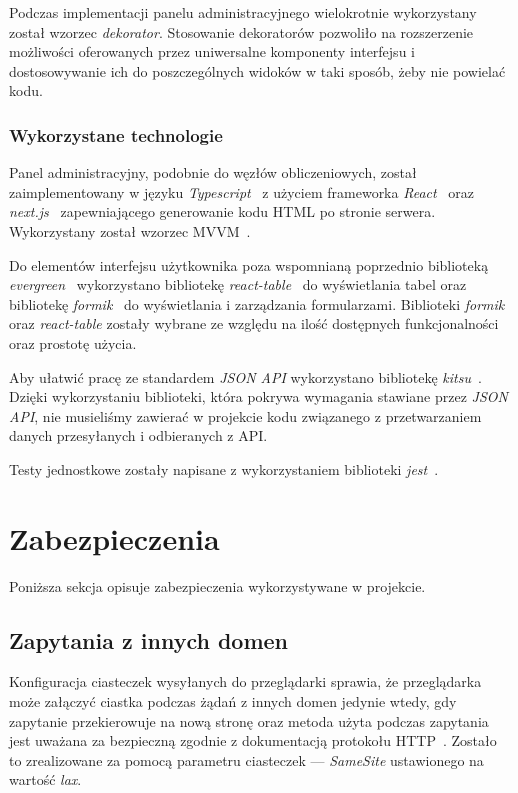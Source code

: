 \documentclass[a4paper,11pt,twoside]{report}
\theoremstyle{definition}
\begin{document}
Podczas implementacji panelu administracyjnego wielokrotnie wykorzystany został wzorzec \textit{dekorator}. Stosowanie dekoratorów pozwoliło na rozszerzenie możliwości oferowanych przez uniwersalne komponenty interfejsu i dostosowywanie ich do poszczególnych widoków w taki sposób, żeby nie powielać kodu.


\subsubsection{Wykorzystane technologie}
Panel administracyjny, podobnie do węzłów obliczeniowych, został zaimplementowany w języku \textit{Typescript}~\cite{typescript} z użyciem frameworka \textit{React}~\cite{react} oraz \textit{next.js}~\cite{next.js} zapewniającego generowanie kodu HTML po stronie serwera. Wykorzystany został wzorzec MVVM~\cite{mvvm}.

Do elementów interfejsu użytkownika poza wspomnianą poprzednio biblioteką \textit{evergreen}~\cite{evergreen} wykorzystano bibliotekę \textit{react-table}~\cite{react-table} do wyświetlania tabel oraz bibliotekę \textit{formik}~\cite{formik} do wyświetlania i zarządzania formularzami. Biblioteki \textit{formik} oraz \textit{react-table} zostały wybrane ze względu na ilość dostępnych funkcjonalności oraz prostotę użycia.

Aby ułatwić pracę ze standardem \textit{JSON API} wykorzystano bibliotekę \textit{kitsu}~\cite{kitsu}.
Dzięki wykorzystaniu biblioteki, która pokrywa wymagania stawiane przez \textit{JSON API}, nie musieliśmy zawierać w projekcie kodu związanego z przetwarzaniem danych przesyłanych i odbieranych z API.

Testy jednostkowe zostały napisane z wykorzystaniem biblioteki \textit{jest}~\cite{jest}.


\section{Zabezpieczenia}

Poniższa sekcja opisuje zabezpieczenia wykorzystywane w projekcie.

\subsection{Zapytania z innych domen}

Konfiguracja ciasteczek wysyłanych do przeglądarki sprawia, że przeglądarka może załączyć ciastka podczas żądań z innych domen jedynie wtedy, gdy zapytanie przekierowuje na nową stronę oraz metoda użyta podczas zapytania jest uważana za bezpieczną zgodnie z dokumentacją protokołu HTTP~\cite{rfc-7231}.
Zostało to zrealizowane za pomocą parametru ciasteczek --- \textit{SameSite} ustawionego na wartość \textit{lax}.
\end{document}
